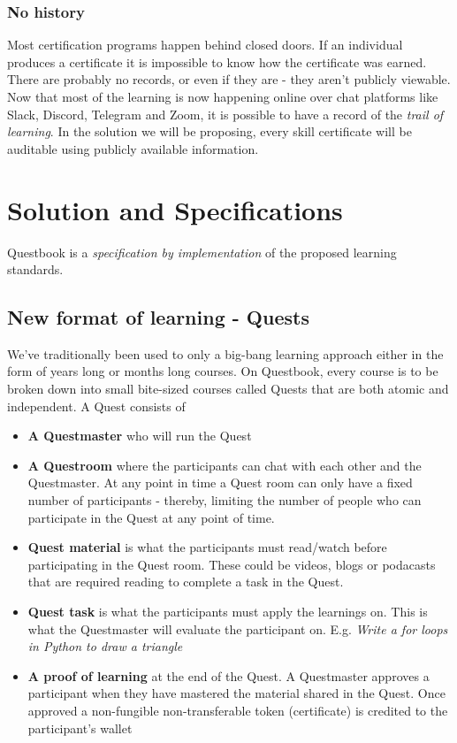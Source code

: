 \documentclass{article}
\begin{document}
      \subsubsection{No history}
        Most certification programs happen behind closed doors. If an individual produces a certificate it is impossible to know how the certificate was earned. There are probably no records, or even if they are - they aren't publicly viewable. 
        \break
        Now that most of the learning is now happening online over chat platforms like Slack, Discord, Telegram and Zoom, it is possible to have a record of the \textit{trail of learning}. In the solution we will be proposing, every skill certificate will be auditable using publicly available information.
  \section{Solution and Specifications}
    Questbook is a \textit{specification by implementation} of the proposed learning standards.
    \subsection{New format of learning - Quests}
      We've traditionally been used to only a big-bang learning approach either in the form of years long or months long courses.
      On Questbook, every course is to be broken down into small bite-sized courses called Quests that are both atomic and independent.
      A Quest consists of 
      \begin{itemize}
        \item \textbf{A Questmaster} who will run the Quest
        \item \textbf{A Questroom} where the participants can chat with each other and the Questmaster. At any point in time a Quest room can only have  a fixed number of participants - thereby, limiting the number of people who can participate in the Quest at any point of time.
        \item \textbf{Quest material} is what the participants must read/watch before participating in the Quest room. These could be videos, blogs or podacasts that are required reading to complete a task in the Quest.
        \item \textbf{Quest task} is what the participants must apply the learnings on. This is what the Questmaster will evaluate the participant on. E.g. \textit{Write a for loops in Python to draw a triangle}
        \item \textbf{A proof of learning} at the end of the Quest. A Questmaster approves a participant when they have mastered the material shared in the Quest. Once approved a non-fungible non-transferable token (certificate) is credited to the participant's wallet
      \end{itemize}
\end{document}
